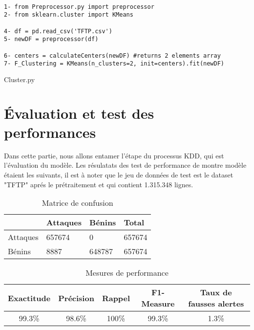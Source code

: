 \begin{algorithm}[H]
\begin{verbatim}

1- from Preprocessor.py import preprocessor 
2- from sklearn.cluster import KMeans

4- df = pd.read_csv('TFTP.csv')
5- newDF = preprocessor(df)

6- centers = calculateCenters(newDF) #returns 2 elements array
7- F_Clustering = KMeans(n_clusters=2, init=centers).fit(newDF) 

\end{verbatim}
\caption{Cluster.py}
\end{algorithm}

\section{Évaluation et test des performances}
Dans cette partie, nous allons entamer l'étape du processus KDD, qui est l'évaluation du modèle. Les résulatats des test de performance de montre modèle étaient les suivants, il est à noter que le jeu de données de test est le dataset "TFTP" aprés le prétraitement et qui contient 1.315.348 lignes.

\begin{table}[h]
	\begin{center}
		\begin{tabular}{  | m{2.5cm} | m{2.5cm} | m{2.5cm} || m{2cm} | }
			\hline
			  & Attaques & Bénins & Total\\
			\hline
			Attaques & 657674 & 0 & 657674\\
			\hline
			Bénins & 8887 & 648787 & 657674\\
			\hline
		\end{tabular}
		\caption{Matrice de confusion}
	\end{center}
	\label{table:NIDS_Evaluation}
\end{table}

\begin{table}[h]
	\begin{center}
		\begin{tabular}{  | c | c | c | c | c | }
			\hline
			\rowcolor[rgb]{0.85,0.85,0.85}
			 Exactitude & Précision & Rappel & F1-Measure & Taux de fausses alertes\\
			\hline
			99.3\% & 98.6\% & 100\% & 99.3\% & 1.3\%\\
			\hline
		\end{tabular}
		\caption{Mesures de performance }
	\end{center}
	\label{table:F_Clustering_Evaluation}
\end{table}

